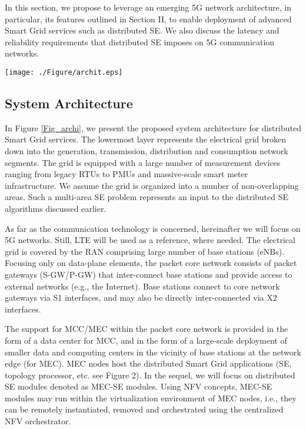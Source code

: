 \documentclass[journal]{IEEEtran}
\begin{document}
In this section, we propose to leverage an emerging 5G network architecture, in particular, its features outlined in Section II, to enable deployment of advanced Smart Grid services such as distributed SE. We also discuss the latency and reliability requirements that distributed SE imposes on 5G communication networks.

	\begin{figure*}[ht]
	\centering
	\texttt{[image: ./Figure/archit.eps]}
	\caption{The architecture with two layers: i) power system infrastructure and 
	ii) communication infrastructure that combines novel RAN interfaces supporting 
	mMTC and URLLC, and new virtualized core network (CN) MEC/MCC-based 
	architecture with network topology processor (NTP), observability analysis (OA), 
	state estimation algorithm (SE) and bad data processing (BDP) routines, 
	to support future Smart Grid services such as distributed SE.}
	\label{Fig_archi}
	\end{figure*}

\subsection{System Architecture}

In Figure \ref{Fig_archi}, we present the proposed system architecture for distributed Smart Grid services. The lowermost layer represents the electrical grid broken down into the generation, transmission, distribution and consumption network segments. The grid is equipped with a large number of measurement devices ranging from legacy RTUs to PMUs and massive-scale smart meter infrastructure. We assume the grid is organized into a number of non-overlapping areas. Such a multi-area SE problem represents an input to the distributed SE algorithms discussed earlier.

As far as the communication technology is concerned, hereinafter we will focus on 5G networks. Still, LTE will be used as a reference, where needed. The electrical grid is covered by the RAN comprising large number of base stations (eNBs). Focusing only on data-plane elements, the packet core network consists of packet gateways (S-GW/P-GW) that inter-connect base stations and provide access to external networks (e.g., the Internet). Base stations connect to core network gateways via S1 interfaces, and may also be directly inter-connected via X2 interfaces.

The support for MCC/MEC within the packet core network is provided in the form of a data center for MCC, and in the form of a large-scale deployment of smaller data and computing centers in the vicinity of base stations at the network edge (for MEC). MEC nodes host the distributed Smart Grid applications (SE, topology processor, etc. see Figure 2). In the sequel, we will focus on distributed SE modules denoted as MEC-SE modules. Using NFV concepts, MEC-SE modules may run within the virtualization environment of MEC nodes, i.e., they can be remotely instantiated, removed and orchestrated using the centralized NFV orchestrator.
\end{document}
